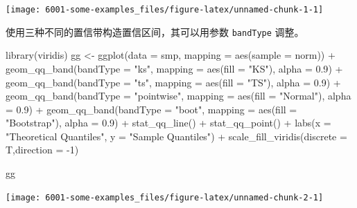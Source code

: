 \documentclass[
]{book}
\newenvironment{Shaded}{\begin{snugshade}}{\end{snugshade}}
\newcommand{\AttributeTok}[1]{\textcolor[rgb]{0.77,0.63,0.00}{#1}}
\newcommand{\DecValTok}[1]{\textcolor[rgb]{0.00,0.00,0.81}{#1}}
\newcommand{\FloatTok}[1]{\textcolor[rgb]{0.00,0.00,0.81}{#1}}
\newcommand{\FunctionTok}[1]{\textcolor[rgb]{0.00,0.00,0.00}{#1}}
\newcommand{\NormalTok}[1]{#1}
\newcommand{\OtherTok}[1]{\textcolor[rgb]{0.56,0.35,0.01}{#1}}
\newcommand{\SpecialCharTok}[1]{\textcolor[rgb]{0.00,0.00,0.00}{#1}}
\newcommand{\StringTok}[1]{\textcolor[rgb]{0.31,0.60,0.02}{#1}}
\begin{document}
\begin{center}\texttt{[image: 6001-some-examples\_files/figure-latex/unnamed-chunk-1-1]} \end{center}

使用三种不同的置信带构造置信区间，其可以用参数 \texttt{bandType} 调整。

\begin{Shaded}
\begin{Highlighting}[]
\FunctionTok{library}\NormalTok{(viridis)}
\NormalTok{gg }\OtherTok{\textless{}{-}} \FunctionTok{ggplot}\NormalTok{(}\AttributeTok{data =}\NormalTok{ smp, }\AttributeTok{mapping =} \FunctionTok{aes}\NormalTok{(}\AttributeTok{sample =}\NormalTok{ norm)) }\SpecialCharTok{+}
    \FunctionTok{geom\_qq\_band}\NormalTok{(}\AttributeTok{bandType =} \StringTok{"ks"}\NormalTok{, }\AttributeTok{mapping =} \FunctionTok{aes}\NormalTok{(}\AttributeTok{fill =} \StringTok{"KS"}\NormalTok{), }\AttributeTok{alpha =} \FloatTok{0.9}\NormalTok{) }\SpecialCharTok{+}
    \FunctionTok{geom\_qq\_band}\NormalTok{(}\AttributeTok{bandType =} \StringTok{"ts"}\NormalTok{, }\AttributeTok{mapping =} \FunctionTok{aes}\NormalTok{(}\AttributeTok{fill =} \StringTok{"TS"}\NormalTok{), }\AttributeTok{alpha =} \FloatTok{0.9}\NormalTok{) }\SpecialCharTok{+}
    \FunctionTok{geom\_qq\_band}\NormalTok{(}\AttributeTok{bandType =} \StringTok{"pointwise"}\NormalTok{, }\AttributeTok{mapping =} \FunctionTok{aes}\NormalTok{(}\AttributeTok{fill =} \StringTok{"Normal"}\NormalTok{), }\AttributeTok{alpha =} \FloatTok{0.9}\NormalTok{) }\SpecialCharTok{+}
    \FunctionTok{geom\_qq\_band}\NormalTok{(}\AttributeTok{bandType =} \StringTok{"boot"}\NormalTok{, }\AttributeTok{mapping =} \FunctionTok{aes}\NormalTok{(}\AttributeTok{fill =} \StringTok{"Bootstrap"}\NormalTok{), }\AttributeTok{alpha =} \FloatTok{0.9}\NormalTok{) }\SpecialCharTok{+}
    \FunctionTok{stat\_qq\_line}\NormalTok{() }\SpecialCharTok{+}
    \FunctionTok{stat\_qq\_point}\NormalTok{() }\SpecialCharTok{+}
    \FunctionTok{labs}\NormalTok{(}\AttributeTok{x =} \StringTok{"Theoretical Quantiles"}\NormalTok{, }\AttributeTok{y =} \StringTok{"Sample Quantiles"}\NormalTok{) }\SpecialCharTok{+}
    \FunctionTok{scale\_fill\_viridis}\NormalTok{(}\AttributeTok{discrete =}\NormalTok{ T,}\AttributeTok{direction =} \SpecialCharTok{{-}}\DecValTok{1}\NormalTok{)}

\NormalTok{gg}
\end{Highlighting}
\end{Shaded}

\begin{center}\texttt{[image: 6001-some-examples\_files/figure-latex/unnamed-chunk-2-1]} \end{center}
\end{document}
